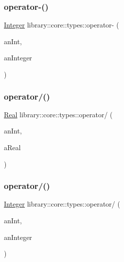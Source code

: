 \subsubsection{\texorpdfstring{operator-\/()}{operator-()}\hspace{0.1cm}{\footnotesize\ttfamily [2/2]}}
{\footnotesize\ttfamily \hyperlink{classlibrary_1_1core_1_1types_1_1_integer}{Integer} library\+::core\+::types\+::operator-\/ (\begin{DoxyParamCaption}\item[{const \hyperlink{classlibrary_1_1core_1_1types_1_1_integer_a623afb1580f870fd8a1997b1c12c917d}{Integer\+::\+Value\+Type} \&}]{an\+Int,  }\item[{const \hyperlink{classlibrary_1_1core_1_1types_1_1_integer}{Integer} \&}]{an\+Integer }\end{DoxyParamCaption})}

\mbox{\label{namespacelibrary_1_1core_1_1types_a658c106fe2c6306de5469a586c287bc2}} 
\subsubsection{\texorpdfstring{operator/()}{operator/()}\hspace{0.1cm}{\footnotesize\ttfamily [1/2]}}
{\footnotesize\ttfamily \hyperlink{classlibrary_1_1core_1_1types_1_1_real}{Real} library\+::core\+::types\+::operator/ (\begin{DoxyParamCaption}\item[{const \hyperlink{classlibrary_1_1core_1_1types_1_1_real_a9c5c8826b7e5a8e39544d23fea6c0e1c}{Real\+::\+Value\+Type} \&}]{an\+Int,  }\item[{const \hyperlink{classlibrary_1_1core_1_1types_1_1_real}{Real} \&}]{a\+Real }\end{DoxyParamCaption})}

\mbox{\label{namespacelibrary_1_1core_1_1types_af520df27ed5123ce801e1d397bfd3234}} 
\subsubsection{\texorpdfstring{operator/()}{operator/()}\hspace{0.1cm}{\footnotesize\ttfamily [2/2]}}
{\footnotesize\ttfamily \hyperlink{classlibrary_1_1core_1_1types_1_1_integer}{Integer} library\+::core\+::types\+::operator/ (\begin{DoxyParamCaption}\item[{const \hyperlink{classlibrary_1_1core_1_1types_1_1_integer_a623afb1580f870fd8a1997b1c12c917d}{Integer\+::\+Value\+Type} \&}]{an\+Int,  }\item[{const \hyperlink{classlibrary_1_1core_1_1types_1_1_integer}{Integer} \&}]{an\+Integer }\end{DoxyParamCaption})}

